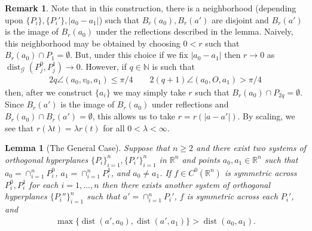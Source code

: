\documentclass[12pt]{amsart}
\numberwithin{equation}{section}
\theoremstyle{plain}
\newtheorem{lemma}[theorem]{Lemma}
\theoremstyle{definition}
\newtheorem{remark}[theorem]{Remark}
\newcommand{\dist}{\mathop\mathrm{dist}\nolimits}
\begin{document}
\begin{remark}\label{r:reflections nbhd}
    Note that in this construction, there is a neighborhood (depending upon $\{P_i\}, \{P_{i}'\}, |a_0-a_1|$) such that $B_r(a_0), B_r(a')$ are disjoint and $B_r(a')$ is the image of $B_r(a_0)$ under the reflections described in the lemma.  Naively, this neighborhood may be obtained by choosing $0<r$ such that $B_r(a_0) \cap P_1 = \emptyset$. But, under this choice if we fix $|a_0 - a_1|$ then $r \rightarrow 0$ as $\dist_{\mathcal{G}}(P^0_j, P^1_j) \rightarrow 0$.  However, if $q \in \mathbb{N}$ is such that 
    \begin{align*}
        2q \angle(a_0, v_0, a_1) \le \pi/4 \qquad 2(q+1) \angle(a_0, O, a_1) > \pi/4
    \end{align*} then, after we construct $\{a_i\}$ we may simply take $r$ such that $B_r(a_0) \cap P_{2q} = \emptyset$.  Since $B_r(a')$ is the image of $B_r(a_0)$ under reflections and $B_r(a_0) \cap B_r(a') = \emptyset$, this allows us to take $r= r(|a-a'|)$.  By scaling, we see that $r(\lambda t) = \lambda r(t)$ for all $0<\lambda<\infty$.
\end{remark}

\begin{lemma}[The General Case]\label{l:reflection arg}
Suppose that $n\ge 2$ and there exist two systems of orthogonal hyperplanes $\{P_i\}_{i=1}^n, \{P_i' \}_{i=1}^n$ in $\mathbb{R}^n$ and points $a_0, a_1 \in \mathbb{R}^n$ such that $a_0 = \cap_{i=1}^n P^0_i$, $a_1 = \cap_{i=1}^n P_i^1$, and $a_0 \not = a_1$.  If $f \in C^0(\mathbb{R}^n)$ is symmetric across $P_i^0, P_i^1$ for each $i=1,..., n$ then there exists another system of orthogonal hyperplanes $\{P_i''\}_{i=1}^n$ such that $a' = \cap_{i=1}^nP_i'$, $f$ is symmetric across each $P_i'$, and 
\begin{align*}
\max\{\dist(a', a_0), \dist(a', a_1)\} > \dist(a_0, a_1).
\end{align*}
\end{lemma}
\end{document}
